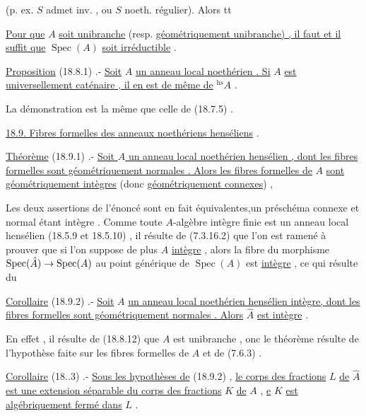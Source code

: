  (p. ex. $S$ admet  inv. , ou $S$ noeth. régulier). Alors tt

\uline{Pour que} $A$ \uline{soit unibranche} (resp. \uline{géométriquement unibranche) , il faut et il suffit que} $\operatorname{Spec}(A)$ \uline{soit irréductible} .

\uline{Proposition} (18.8.1) .- \uline{Soit} $A$ \uline{un anneau local noethérien . Si} $A$ \uline{est universellement caténaire , il en est de même de} $ {}^{\mathrm{hs}}A$ .

La démonstration est la même que celle de (18.7.5) .

\uline{18.9. Fibres formelles des anneaux noethériens henséliens} .

\uline{Théorème} (18.9.1) .- \uline{Soit $A$ un anneau local noethérien hensélien , dont les fibres formelles sont géométriquement normales . Alors les fibres formelles de} $A$ \uline{sont géométriquement intègres} (donc \uline{géométriquement connexes}) ,

Les deux assertions de l'énoncé sont en fait équivalentes,un préschéma  connexe et normal étant intègre . Comme toute $A$-algèbre intègre finie est un anneau local hensélien (18.5.9 et 18.5.10) , il résulte de (7.3.16.2) que l'on est ramené à prouver que si l'on suppose de plus $A$ \uline{intègre} , alors la fibre du morphisme $\operatorname{Spec}(\hat A)\to\operatorname{Spec}(A)$ au point générique de $\operatorname{Spec}(A)$ est \uline{intègre} , ce qui résulte du

\uline{Corollaire} (18.9.2) .- \uline{Soit} $A$ \uline{un anneau local noethérien hensélien intègre, dont les fibres formelles sont géométriquement normales . Alors} $\hat A$ \uline{est intè}\uline{gre} .

En effet , il résulte de (18.8.12) que $A$ est unibranche , onc  le théorème résulte de l'hypothèse faite sur les fibres formelles de $A$ et de (7.6.3) .

\uline{Corollaire} (18..3) .- \uline{Sous les hypothèses de} (18.9.2) , \uline{le corps des fractions} $L$ \uline{de} $\hat A$ \uline{est une extension séparable du corps des fractions} $K$ \uline{de} $A$ , \uline{e} $K$ \uline{est algébriquement fermé dans} $L$ .

